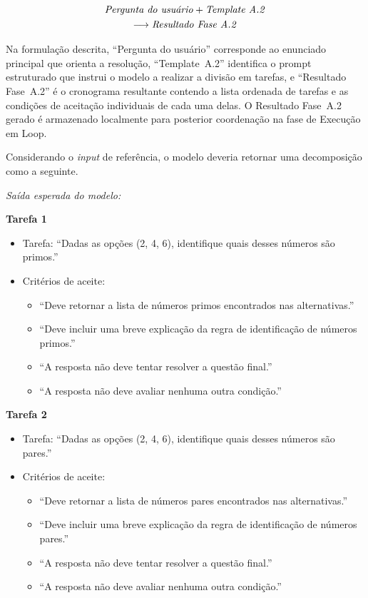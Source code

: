 \documentclass[a4paper,10pt,twocolumn]{article}
\newcommand{\saidaLLM}{%
  \smallskip\noindent\textit{Saída esperada do modelo:}\smallskip\par
}
\begin{document}
\begin{multline} \label{eq:fluxo_a2}
\text{\textit{Pergunta do usuário}} + \text{\textit{Template A.2}} \\
\longrightarrow \text{\textit{Resultado Fase A.2}}
\end{multline}

Na formulação descrita, ``Pergunta do usuário'' corresponde ao enunciado principal que orienta a resolução, ``Template~A.2'' identifica o prompt estruturado que instrui o modelo a realizar a divisão em tarefas, e ``Resultado Fase~A.2'' é o cronograma resultante contendo a lista ordenada de tarefas e as condições de aceitação individuais de cada uma delas. O Resultado Fase~A.2 gerado é armazenado localmente para posterior coordenação na fase de Execução em Loop.

\begin{exemplo}
Considerando o \textit{input} de referência, o modelo deveria retornar uma decomposição como a seguinte.

\saidaLLM

\textbf{Tarefa 1}
\begin{itemize}
    \item Tarefa: ``Dadas as opções (2, 4, 6), identifique quais desses números são primos.''
    \item Critérios de aceite:
    \begin{itemize}
        \item ``Deve retornar a lista de números primos encontrados nas alternativas.''
        \item ``Deve incluir uma breve explicação da regra de identificação de números primos.''
        \item ``A resposta não deve tentar resolver a questão final.''
        \item ``A resposta não deve avaliar nenhuma outra condição.''
    \end{itemize}
\end{itemize}

\textbf{Tarefa 2}
\begin{itemize}
    \item Tarefa: ``Dadas as opções (2, 4, 6), identifique quais desses números são pares.''
    \item Critérios de aceite:
    \begin{itemize}
        \item ``Deve retornar a lista de números pares encontrados nas alternativas.''
        \item ``Deve incluir uma breve explicação da regra de identificação de números pares.''
        \item ``A resposta não deve tentar resolver a questão final.''
        \item ``A resposta não deve avaliar nenhuma outra condição.''
    \end{itemize}
\end{itemize}


\end{exemplo}
\end{document}
